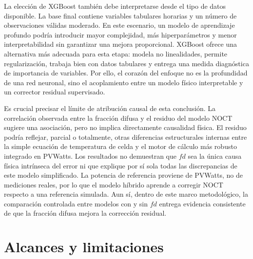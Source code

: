 \documentclass[12pt, letterpaper]{article}
\begin{document}
La elecci\'on de XGBoost tambi\'en debe interpretarse desde el tipo de datos disponible. La base final contiene variables tabulares horarias y un n\'umero de observaciones v\'alidas moderado. En este escenario, un modelo de aprendizaje profundo podr\'ia introducir mayor complejidad, m\'as hiperpar\'ametros y menor interpretabilidad sin garantizar una mejora proporcional. XGBoost ofrece una alternativa m\'as adecuada para esta etapa: modela no linealidades, permite regularizaci\'on, trabaja bien con datos tabulares y entrega una medida diagn\'ostica de importancia de variables. Por ello, el coraz\'on del enfoque no es la profundidad de una red neuronal, sino el acoplamiento entre un modelo f\'isico interpretable y un corrector residual supervisado.

Es crucial precisar el l\'imite de atribuci\'on causal de esta conclusi\'on. La correlaci\'on observada entre la fracci\'on difusa y el residuo del modelo NOCT sugiere una asociaci\'on, pero no implica directamente causalidad f\'isica. El residuo podr\'ia reflejar, parcial o totalmente, otras diferencias estructurales internas entre la simple ecuaci\'on de temperatura de celda y el motor de c\'alculo m\'as robusto integrado en PVWatts. Los resultados no demuestran que \(fd\) sea la \'unica causa f\'isica intr\'inseca del error ni que explique por s\'i sola todas las discrepancias de este modelo simplificado. La potencia de referencia proviene de PVWatts, no de mediciones reales, por lo que el modelo h\'ibrido aprende a corregir NOCT respecto a una referencia simulada. Aun s\'i, dentro de este marco metodol\'ogico, la comparaci\'on controlada entre modelos con y sin \(fd\) entrega evidencia consistente de que la fracci\'on difusa mejora la correcci\'on residual.


\section{Alcances y limitaciones}
\end{document}
